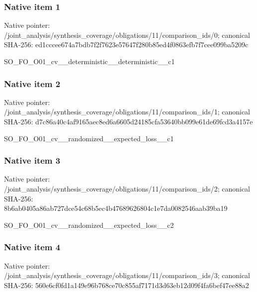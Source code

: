 \documentclass[10pt,a4paper]{article}
\begin{document}
\subsubsection{Native item 1}
Native pointer: /joint\_\allowbreak{}analysis/synthesis\_\allowbreak{}coverage/obligations/11/comparison\_\allowbreak{}ids/0; canonical SHA-256: ed1cccee674a7bdb7f2f7623e57647f280b85ed4f0863efb7f7cee099ba5209c

\begingroup\raggedright\sloppy SO\_\allowbreak{}FO\_\allowbreak{}O01\_\allowbreak{}cv\_\allowbreak{}\_\allowbreak{}deterministic\_\allowbreak{}\_\allowbreak{}deterministic\_\allowbreak{}\_\allowbreak{}c1\par\endgroup

\subsubsection{Native item 2}
Native pointer: /joint\_\allowbreak{}analysis/synthesis\_\allowbreak{}coverage/obligations/11/comparison\_\allowbreak{}ids/1; canonical SHA-256: d7c86a40c4af9165aec8ed6a6605d24185cfa53640bb099e61de69fcd3a4157e

\begingroup\raggedright\sloppy SO\_\allowbreak{}FO\_\allowbreak{}O01\_\allowbreak{}cv\_\allowbreak{}\_\allowbreak{}randomized\_\allowbreak{}\_\allowbreak{}expected\_\allowbreak{}loss\_\allowbreak{}\_\allowbreak{}c1\par\endgroup

\subsubsection{Native item 3}
Native pointer: /joint\_\allowbreak{}analysis/synthesis\_\allowbreak{}coverage/obligations/11/comparison\_\allowbreak{}ids/2; canonical SHA-256: 8b6ab0405a86ab727dce54c68b5ec4b47689626804c1e7da0082546aab39ba19

\begingroup\raggedright\sloppy SO\_\allowbreak{}FO\_\allowbreak{}O01\_\allowbreak{}cv\_\allowbreak{}\_\allowbreak{}randomized\_\allowbreak{}\_\allowbreak{}expected\_\allowbreak{}loss\_\allowbreak{}\_\allowbreak{}c2\par\endgroup

\subsubsection{Native item 4}
Native pointer: /joint\_\allowbreak{}analysis/synthesis\_\allowbreak{}coverage/obligations/11/comparison\_\allowbreak{}ids/3; canonical SHA-256: 560e6cf0fd1a149e96b768ce70c855af7171d3d63eb12d09f4fa6bef47ee88a2
\end{document}
